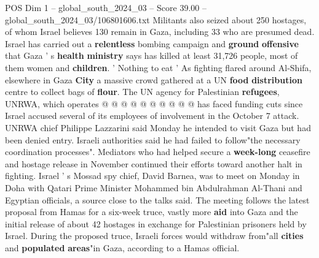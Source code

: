 \begin{textsample}{POS Dim 1 – global\_south\_2024\_03 – Score 39.00 – global\_south\_2024\_03/106801606.txt}
Militants also seized about 250 hostages, of whom Israel believes 130 remain in Gaza, including 33 who are presumed dead.
Israel has carried out a \textbf{relentless} bombing campaign and \textbf{ground} \textbf{offensive} that Gaza ' s \textbf{health} \textbf{ministry} says has killed at least 31,726 people, most of them women and \textbf{children}. ' Nothing to eat ' As fighting flared around Al-Shifa, elsewhere in Gaza \textbf{City} a massive crowd gathered at a UN \textbf{food} \textbf{distribution} centre to collect bags of \textbf{flour}.
The UN agency for Palestinian \textbf{refugees}, UNRWA, which operates @ @ @ @ @ @ @ @ @ @ has faced funding cuts since Israel accused several of its employees of involvement in the October 7 attack.
UNRWA chief Philippe Lazzarini said Monday he intended to visit Gaza but had been denied entry.
Israeli authorities said he had failed to follow"the necessary coordination processes".
Mediators who had helped secure a \textbf{week-long} ceasefire and hostage release in November continued their efforts toward another halt in fighting.
Israel ' s Mossad spy chief, David Barnea, was to meet on Monday in Doha with Qatari Prime Minister Mohammed bin Abdulrahman Al-Thani and Egyptian officials, a source close to the talks said.
The meeting follows the latest proposal from Hamas for a six-week truce, vastly more \textbf{aid} into Gaza and the initial release of about 42 hostages in exchange for Palestinian prisoners held by Israel.
During the proposed truce, Israeli forces would withdraw from"all \textbf{cities} and \textbf{populated} \textbf{areas}"in Gaza, according to a Hamas official.

\end{textsample}
